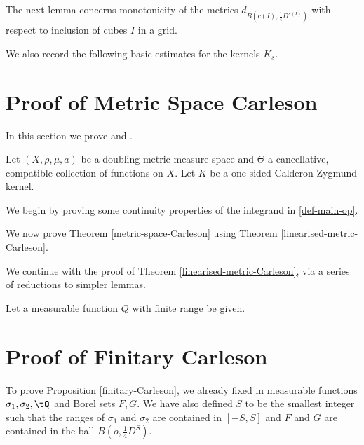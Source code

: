 The next lemma concerns monotonicity of the metrics $d_{B(c(I), \frac 14 D^{s(I)})}$ with respect to inclusion of cubes $I$ in a grid.




We also record the following basic estimates for the kernels $K_s$.





\section{Proof of Metric Space Carleson}
\label{thmfromproplinear}

In this section we prove  and .

Let $(X, \rho, \mu, a)$ be a doubling metric measure space and $\Theta$ a cancellative, compatible collection of functions on $X$. Let $K$ be a one-sided Calderon-Zygmund kernel.

We begin by proving some continuity properties of the integrand in \eqref{def-main-op}.




We now prove Theorem \ref{metric-space-Carleson} using Theorem \ref{linearised-metric-Carleson}.



We continue with the proof of Theorem \ref{linearised-metric-Carleson}, via a series of reductions to simpler lemmas.

Let a measurable function $Q$ with finite range be given.












\section{Proof of Finitary Carleson}
\label{christsection}

To prove Proposition
\ref{finitary-Carleson}, we already fixed in 
measurable functions ${\sigma_1},\sigma_2, \tQ$ and Borel sets $F,G$. We have also
defined $S$ to be the smallest
integer such that the ranges of
$\sigma_1$ and $\sigma_2$ are contained in $[-S,S]$ and $F$ and $G$ are contained
in the ball $B(o, \frac 14 D^S)$.


